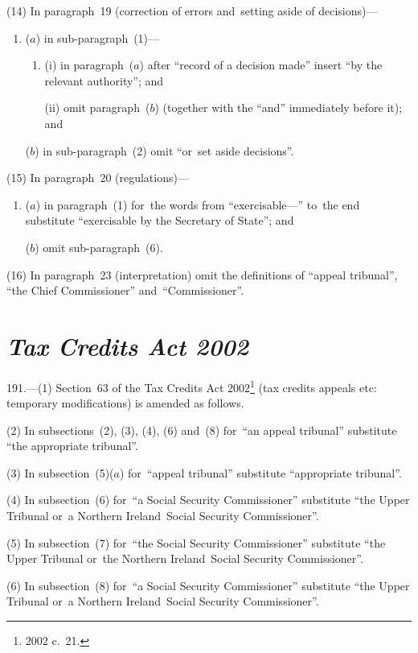 \documentclass[12pt,a4paper]{article}
\begin{document}
(14) In paragraph~19 (correction of errors and~setting aside of decisions)—
\begin{enumerate}\item[]
($a$) in sub-paragraph~(1)—
\begin{enumerate}\item[]
(i) in paragraph~($a$)  after “record of a decision made” insert “by the relevant authority”; and

(ii) omit paragraph~($b$)  (together with the “and” immediately before it); and
\end{enumerate}

($b$) in sub-paragraph~(2) omit “or~set aside decisions”.
\end{enumerate}

(15) In paragraph~20 (regulations)—
\begin{enumerate}\item[]
($a$) in paragraph~(1) for~the words from “exercisable—” to~the end substitute “exercisable by the Secretary of State”; and

($b$) omit sub-paragraph~(6).
\end{enumerate}

(16) In paragraph~23 (interpretation) omit the definitions of “appeal tribunal”, “the Chief Commissioner” and~“Commissioner”.

\section*{\itshape Tax Credits Act 2002}

191.---(1)  Section~63 of the Tax Credits Act 2002\footnote{2002 c.~21.} (tax credits appeals etc: temporary modifications) is amended as follows.

(2) In subsections~(2), (3), (4), (6) and~(8) for~“an appeal tribunal” substitute “the appropriate tribunal”.

(3) In subsection~(5)($a$)  for~“appeal tribunal” substitute “appropriate tribunal”.

(4) In subsection~(6) for~“a Social Security Commissioner” substitute “the Upper Tribunal or~a Northern Ireland~Social Security Commissioner”.

(5) In subsection~(7) for~“the Social Security Commissioner” substitute “the Upper Tribunal or~the Northern Ireland~Social Security Commissioner”.

(6) In subsection~(8) for~“a Social Security Commissioner” substitute “the Upper Tribunal or~a Northern Ireland~Social Security Commissioner”.
\end{document}
